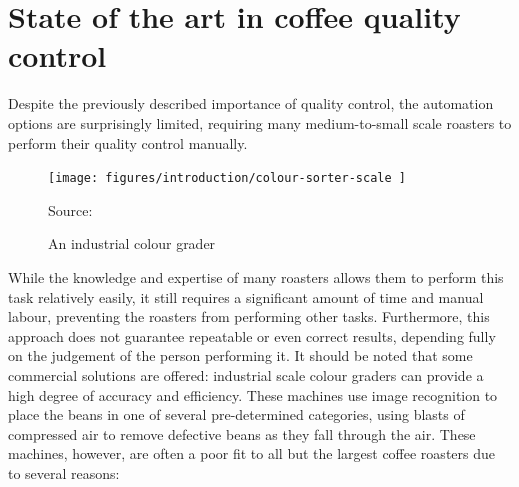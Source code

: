 \section{State of the art in coffee quality control}
\label{sec:qc-state-of-the-art} Despite the previously described importance of quality
control, the automation options are surprisingly limited, requiring many medium-to-small
scale roasters to perform their quality control manually.
\begin{figure}
	\texttt{[image: 
		figures/introduction/colour-sorter-scale
	]}
	\caption*
	{Source: \cite{colourSorterImg}}
	\caption{An industrial colour grader}
	\label{fig:colourSorterExample}
\end{figure}
While the knowledge
and expertise of many roasters allows them to perform this task relatively
easily, it still requires a significant amount of time and manual labour,
preventing the roasters from performing other tasks. Furthermore, this approach
does not guarantee repeatable or even correct results, depending fully on the judgement
of the person performing it.
It should be noted that some commercial solutions are offered: industrial scale colour
graders can provide a high degree of accuracy and efficiency. These machines use
image recognition to place the beans in one of several pre-determined categories,
using blasts of compressed air to remove defective beans as they fall through the
air.
These machines, however, are often a poor fit to all but the largest coffee
roasters due to several reasons:
